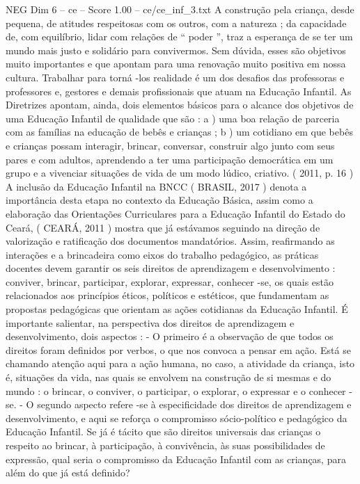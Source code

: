 \begin{textsample}{NEG Dim 6 – ce – Score 1.00 – ce/ce\_inf\_3.txt}
A construção pela criança, desde pequena, de atitudes respeitosas com os outros, com a natureza ; da capacidade de, com equilíbrio, lidar com relações de “ poder ”, traz a esperança de se ter um mundo mais justo e solidário para convivermos.
Sem dúvida, esses são objetivos muito importantes e que apontam para uma renovação muito positiva em nossa cultura.
Trabalhar para torná -los realidade é um dos desafios das professoras e professores e, gestores e demais profissionais que atuam na Educação Infantil.
As Diretrizes apontam, ainda, dois elementos básicos para o alcance dos objetivos de uma Educação Infantil de qualidade que são : a ) uma boa relação de parceria com as famílias na educação de bebês e crianças ; b ) um cotidiano em que bebês e crianças possam interagir, brincar, conversar, construir algo junto com seus pares e com adultos, aprendendo a ter uma participação democrática em um grupo e a vivenciar situações de vida de um modo lúdico, criativo. ( 2011, p. 16 ) A inclusão da Educação Infantil na BNCC ( BRASIL, 2017 ) denota a importância desta etapa no contexto da Educação Básica, assim como a elaboração das Orientações Curriculares para a Educação Infantil do Estado do Ceará, ( CEARÁ, 2011 ) mostra que já estávamos seguindo na direção de valorização e ratificação dos documentos mandatórios.
Assim, reafirmando as interações e a brincadeira como eixos do trabalho pedagógico, as práticas docentes devem garantir os seis direitos de aprendizagem e desenvolvimento : conviver, brincar, participar, explorar, expressar, conhecer -se, os quais estão relacionados aos princípios éticos, políticos e estéticos, que fundamentam as propostas pedagógicas que orientam as ações cotidianas da Educação Infantil.
É importante salientar, na perspectiva dos direitos de aprendizagem e desenvolvimento, dois aspectos : - O primeiro é a observação de que todos os direitos foram definidos por verbos, o que nos convoca a pensar em ação.
Está se chamando atenção aqui para a ação humana, no caso, a atividade da criança, isto é, situações da vida, nas quais se envolvem na construção de si mesmas e do mundo : o brincar, o conviver, o participar, o explorar, o expressar e o conhecer -se. - O segundo aspecto refere -se à especificidade dos direitos de aprendizagem e desenvolvimento, e aqui se reforça o compromisso sócio-político e pedagógico da Educação Infantil.
Se já é tácito que são direitos universais das crianças o respeito ao brincar, à participação, à convivência, às suas possibilidades de expressão, qual seria o compromisso da Educação Infantil com as crianças, para além do que já está definido?

\end{textsample}
